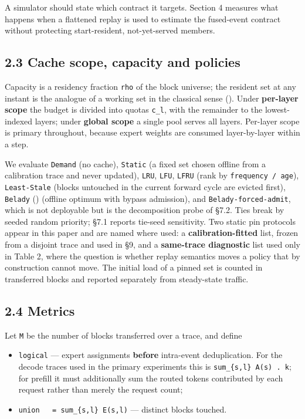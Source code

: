 \documentclass[
  10pt,
  letterpaper,
  10pt]{article}
\providecommand{\tightlist}{%
  \setlength{\itemsep}{0pt}\setlength{\parskip}{0pt}}
\begin{document}
A simulator should state which contract it targets. Section 4 measures
what happens when a flattened replay is used to estimate the fused-event
contract without protecting start-resident, not-yet-served members.

\subsection{2.3 Cache scope, capacity and
policies}\label{cache-scope-capacity-and-policies}

Capacity is a residency fraction \texttt{rho} of the block universe; the
resident set at any instant is the analogue of a working set in the
classical sense ().
Under \textbf{per-layer scope} the budget is divided into quotas
\texttt{c\_l}, with the remainder to the lowest-indexed layers; under
\textbf{global scope} a single pool serves all layers. Per-layer scope
is primary throughout, because expert weights are consumed
layer-by-layer within a step.

We evaluate \texttt{Demand} (no cache), \texttt{Static} (a fixed set
chosen offline from a calibration trace and never updated),
\texttt{LRU}, \texttt{LFU}, \texttt{LFRU} (rank by
\texttt{frequency\ /\ age}), \texttt{Least-Stale} (blocks untouched in
the current forward cycle are evicted first), \texttt{Belady}
() (offline optimum
with bypass admission), and \texttt{Belady-forced-admit}, which is not
deployable but is the decomposition probe of §7.2. Ties break by seeded
random priority; §7.1 reports tie-seed sensitivity. Two static pin
protocols appear in this paper and are named where used: a
\textbf{calibration-fitted} list, frozen from a disjoint trace and used
in §9, and a \textbf{same-trace diagnostic} list used only in Table 2,
where the question is whether replay semantics moves a policy that by
construction cannot move. The initial load of a pinned set is counted in
transferred blocks and reported separately from steady-state traffic.

\subsection{2.4 Metrics}\label{metrics}

Let \texttt{M} be the number of blocks transferred over a trace, and
define

\begin{itemize}
\tightlist
\item
  \texttt{logical} --- expert assignments \textbf{before} intra-event
  deduplication. For the decode traces used in the primary experiments
  this is \texttt{sum\_\{s,l\}\ \textbar{}A(s)\textbar{}\ .\ k}; for
  prefill it must additionally sum the routed tokens contributed by each
  request rather than merely the request count;
\item
  \texttt{union\ \ \ =\ sum\_\{s,l\}\ \textbar{}E(s,l)\textbar{}} ---
  distinct blocks touched.
\end{itemize}
\end{document}
